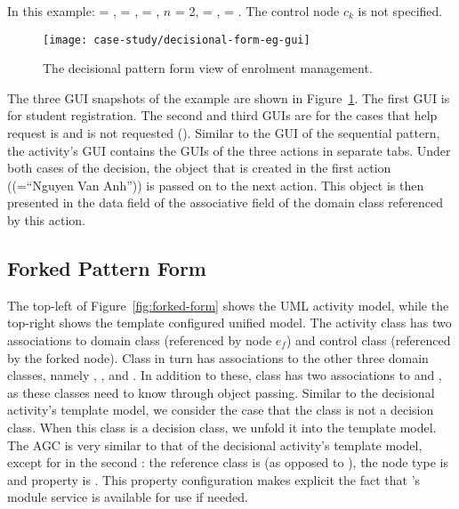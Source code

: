 In this example:  = ,  = ,  = , $ n $ = 2,  = ,  = .
The control node $ c_k $ is not specified.

\begin{figure}[ht]
	\begin{center}
		\texttt{[image: case-study/decisional-form-eg-gui]}
	\end{center}
	\caption{The decisional pattern form view of enrolment management.} %
	\label{fig:decisional-form-eg-gui}
\end{figure}

The three GUI snapshots of the example are shown in Figure~\ref{fig:decisional-form-eg-gui}. The first GUI is for student registration. The second and third GUIs are for the cases that help request is and is not requested (\resp). Similar to the GUI of the sequential pattern, the activity's GUI contains the GUIs of the three actions in separate tabs. Under both cases of the decision, the  object that is created in the first action (\eg {}(=``Nguyen Van Anh'')) is passed on to the next action. This object is then presented in the data field of the associative field  of the domain class referenced by this action.

\subsection{Forked Pattern Form} \label{sect:forked-pattern}

The top-left of Figure~\ref{fig:forked-form} shows the UML activity model, while the top-right shows the template configured unified model. The activity class  has two associations to domain class  (referenced by node $ e_f $) and control class  (referenced by the forked node). Class  in turn has associations to the other three domain classes, namely , , and . In addition to these, class  has two associations to  and , as these classes need to know  through object passing.
%
Similar to the decisional activity's template model, we consider the case that the class  is not a decision class. When this class is a decision class, we unfold it into the template model.
%
The AGC is very similar to that of the decisional activity's template model, except for in the second : the reference class is  (as opposed to ), the node type is  and property  is . This property configuration makes explicit the fact that 's module service is available for use if needed.

